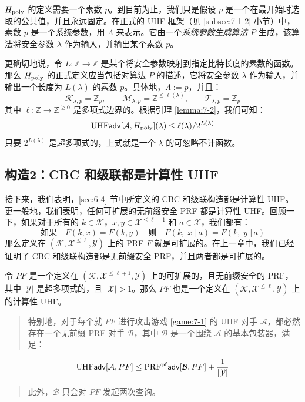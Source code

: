 \begin{snote}[数学细节。]
$H_{\rm poly}$ 的定义需要一个素数 $p$。到目前为止，我们只是假设 $p$ 是一个在最开始时选取的公共值，并且永远固定。在正式的 UHF 框架（见 \ref{subsec:7-1-2} 小节）中，素数 $p$ 是一个系统参数，用 $\Lambda$ 来表示。它由一个\emph{系统参数生成算法} $P$ 生成，该算法将安全参数 $\lambda$ 作为输入，并输出某个素数 $p$。

更确切地说，令 $L:\mathbb{Z}\to\mathbb{Z}$ 是某个将安全参数映射到指定比特长度的素数的函数。那么 $H_{\rm poly}$ 的正式定义应当包括对算法 $P$ 的描述，它将安全参数 $\lambda$ 作为输入，并输出一个长度为 $L(\lambda)$ 的素数 $p$。具体地，$\Lambda:=p$，并且：
\[
\mathcal{K}_{\lambda,p}=\mathbb{Z}_p,
\quad\quad
\mathcal{M}_{\lambda,p}=\mathbb{Z}^{\leq\ell(\lambda)},
\quad\quad
\mathcal{T}_{\lambda,p}=\mathbb{Z}_p
\]
其中 $\ell:\mathbb{Z}\to\mathbb{Z}^{\geq0}$ 是多项式边界的。根据引理 \ref{lemma:7-2}，我们可知：
\[
{\rm UHF}\mathsf{adv}[\mathcal{A},H_{\rm poly}](\lambda)\leq{\ell(\lambda)}/{2^{L(\lambda)}}
\]
只要 $2^{L(\lambda)}$ 是超多项式的，上式就是一个 $\lambda$ 的可忽略不计函数。
\end{snote}

\subsection{构造2：CBC 和级联都是计算性 UHF}

接下来，我们表明，\ref{sec:6-4} 节中所定义的 CBC 和级联构造都是计算性 UHF。更一般地，我们表明，任何可扩展的无前缀安全 PRF 都是计算性 UHF。回顾一下，如果对于所有的 $k\in\mathcal{K}$，$x,y\in\mathcal{X}^{\leq\ell-1}$ 和 $a\in\mathcal{X}$，我们都有：
\[
\text{如果}\quad
F(k,x)=F(k,y)
\quad\text{则}\quad
F(k,\;x\,\Vert\,a)=F(k,\;y\,\Vert\,a)
\]
那么定义在 $(\mathcal{K},\mathcal{X}^{\leq\ell},\mathcal{Y})$ 上的 PRF $F$ 就是可扩展的。在上一章中，我们已经证明了 CBC 和级联构造都是无前缀安全 PRF，并且两者都是可扩展的。

\begin{theorem}\label{theo:7-3}
令 $PF$ 是一个定义在 $(\mathcal{K},\mathcal{X}^{\leq\ell+1},\mathcal{Y})$ 上的可扩展的，且无前缀安全的 PRF，其中 $|\mathcal{Y}|$ 是超多项式的，且 $|\mathcal{X}|>1$。那么 $PF$ 也是一个定义在 $(\mathcal{K},\mathcal{X}^{\leq\ell},\mathcal{Y})$ 上的计算性 UHF。
\begin{quote}
特别地，对于每个就 $PF$ 进行攻击游戏 \ref{game:7-1} 的 UHF 对手 $\mathcal{A}$，都必然存在一个无前缀 PRF 对手 $\mathcal{B}$，其中 $\mathcal{B}$ 是一个围绕 $\mathcal{A}$ 的基本包装器，满足：
\end{quote}
\begin{equation}\label{eq:7-6}
{\rm UHF}\mathsf{adv}[\mathcal{A},PF]\leq{\rm PRF^{pf}}\mathsf{adv}[\mathcal{B},PF]+\frac{1}{|\mathcal{Y}|}
\end{equation}
\begin{quote}
此外，$\mathcal{B}$ 只会对 $PF$ 发起两次查询。
\end{quote}
\end{theorem}

